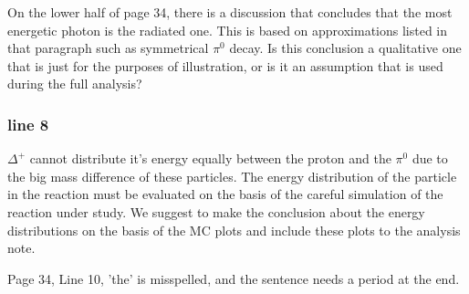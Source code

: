 \documentclass[11pt]{paper}
\begin{document}
On the lower half of page 34, there is a discussion that concludes that the most energetic photon is the radiated one. This is based on approximations listed in that paragraph such as symmetrical $\pi^0$ decay. Is this conclusion a qualitative one that is just for the purposes of illustration, or is it an assumption that is used during the full analysis?

\subsubsection*{line 8} $\Delta^+$ cannot  distribute it's energy equally between the proton and the $\pi^0$ due to the big mass difference of these particles. 
The energy distribution of the particle in the reaction must be evaluated on the basis of the careful simulation of the reaction under study. 
We suggest to make the conclusion about the energy distributions on the basis of the MC plots and include these plots to the analysis note.  

Page 34, Line 10, 'the' is misspelled, and the sentence needs a period at the end.
\end{document}
